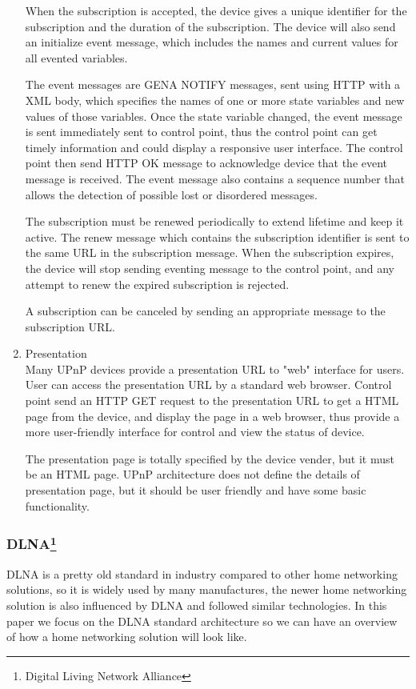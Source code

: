 \begin{enumerate}
When the subscription is accepted, the device gives a unique identifier for the subscription and 
the duration of the subscription. The device will also send an initialize event message, which 
includes the names and current values for all evented variables.

The event messages are GENA NOTIFY messages, sent using HTTP with a XML body, which specifies the 
names of one or more state variables and new values of those variables. Once the state variable 
changed, the event message is sent immediately sent to control point, thus the control point can 
get timely information and could display a responsive user interface. The control point then send 
HTTP OK message to acknowledge device that the event message is received. The event message also 
contains a sequence number that allows the detection of possible lost or disordered messages.

The subscription must be renewed periodically to extend lifetime and keep it active. The renew 
message which contains the subscription identifier is sent to the same URL in the subscription 
message. When the subscription expires, the device will stop sending eventing message to the 
control point, and any attempt to renew the expired subscription is rejected.

A subscription can be canceled by sending an appropriate message to the subscription URL.

\item Presentation \\
Many UPnP devices provide a presentation URL to "web" interface for users. User can access the 
presentation URL by a standard web browser. Control point send an HTTP GET request to the 
presentation URL to get a HTML page from the device, and display the page in a web browser, thus 
provide a more user-friendly interface for control and view the status of device. 

The presentation page is totally specified by the device vender, but it must be an HTML page. 
UPnP architecture does not define the details of presentation page, but it should be user friendly 
and have some basic functionality.

\end{enumerate}
\subsubsection[DLNA]{DLNA\footnote{Digital Living Network Alliance}}
DLNA is a pretty old standard in industry compared to other home networking solutions, so it 
is widely used by many manufactures, the newer home networking solution is also influenced by 
DLNA and followed similar technologies. In this paper we focus on the DLNA standard architecture 
so we can have an overview of how a home networking solution will look like.

